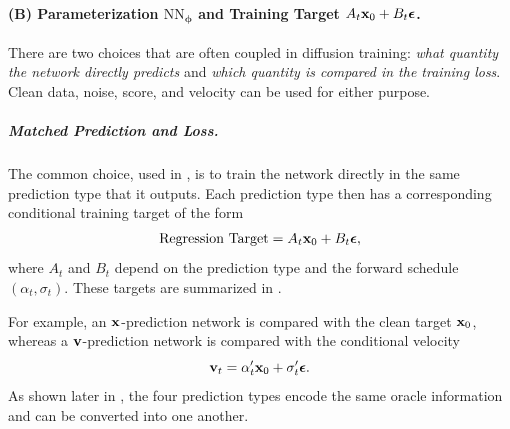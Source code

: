 \paragraph{(B) Parameterization $\mathrm{NN}_{\bm{\phi}}$ and Training Target $A_t {\mathbf{x}}_0 + B_t \bm{\epsilon}$.}
\begin{table}[th!]
  \caption{Summary of the Relationships Between Different Parameterizations.
All four parameterizations are mathematically equivalent and can be converted into one another through straightforward algebraic transformations.
}
  \small
  \centering
  \label{tb:A_t-B_t-parametrizations}
\end{table}
There are two choices that are often coupled in diffusion training:
\emph{what quantity the network directly predicts} and \emph{which quantity
is compared in the training loss}. Clean data, noise, score, and velocity can
be used for either purpose.

\subparagraph{Matched Prediction and Loss.}
The common choice, used in , is to train the
network directly in the same prediction type that it outputs. Each prediction
type then has a corresponding conditional training target of the form
\[
\text{Regression Target}
=
A_t{\mathbf{x}}_0+B_t{\bm{\epsilon}},
\]
where $A_t$ and $B_t$ depend on the prediction type and the forward schedule
$(\alpha_t,\sigma_t)$. These targets are summarized in
.

For example, an ${\mathbf{x}}$-prediction network is compared with the clean target
${\mathbf{x}}_0$, whereas a ${\mathbf{v}}$-prediction network is compared with the conditional
velocity
\[
{\mathbf{v}}_t
=
\alpha_t'{\mathbf{x}}_0+\sigma_t'{\bm{\epsilon}}.
\]
As shown later in , the four prediction types
encode the same oracle information and can be converted into one another.

